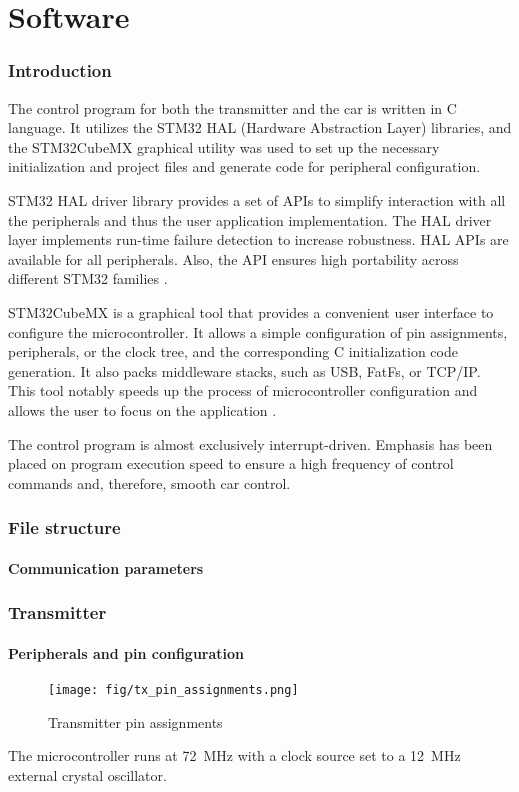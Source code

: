 


\part{Software}
\label{chap:software}
\section{Introduction}
The control program for both the transmitter and the car is written in C language. It utilizes the STM32 HAL (Hardware Abstraction Layer) libraries, and the STM32CubeMX graphical utility was used to set up the necessary initialization and project files and generate code for peripheral configuration.

STM32 HAL driver library provides a set of APIs to simplify interaction with all the peripherals and thus the user application implementation. The HAL driver layer implements run-time failure detection to increase robustness. HAL APIs are available for all peripherals. Also, the API ensures high portability across different STM32 families \cite{hal}.

STM32CubeMX is a graphical tool that provides a convenient user interface to configure the microcontroller. It allows a simple configuration of pin assignments, peripherals, or the clock tree, and the corresponding C initialization code generation. It also packs middleware stacks, such as USB, FatFs, or TCP/IP. This tool notably speeds up the process of microcontroller configuration and allows the user to focus on the application \cite{cubemx}.

The control program is almost exclusively interrupt-driven. Emphasis has been placed on program execution speed to ensure a high frequency of control commands and, therefore, smooth car control.

\section{File structure}
\todo

\subsection{Communication parameters}
\todo


\section{Transmitter}
\subsection{Peripherals and pin configuration}
\label{sub:tx_conf}
\begin{figure}[t]
\centering
\texttt{[image: fig/tx\_pin\_assignments.png]}
\caption{Transmitter pin assignments}
\label{fig:tx_conf}
\end{figure}
The microcontroller runs at \SI{72}{\MHz} with a clock source set to a \SI{12}{\MHz} external crystal oscillator.

